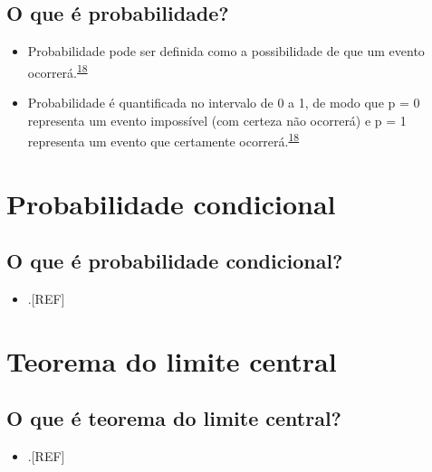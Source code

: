 \documentclass[
]{book}
\providecommand{\tightlist}{%
  \setlength{\itemsep}{0pt}\setlength{\parskip}{0pt}}
\begin{document}
\hypertarget{o-que-uxe9-probabilidade}{%
\subsection{O que é probabilidade?}\label{o-que-uxe9-probabilidade}}

\begin{itemize}
\item
  Probabilidade pode ser definida como a possibilidade de que um evento ocorrerá.\textsuperscript{\protect\hyperlink{ref-Ali2016}{18}}
\item
  Probabilidade é quantificada no intervalo de 0 a 1, de modo que p = 0 representa um evento impossível (com certeza não ocorrerá) e p = 1 representa um evento que certamente ocorrerá.\textsuperscript{\protect\hyperlink{ref-Ali2016}{18}}
\end{itemize}

\hypertarget{probabilidade-ciondicional}{%
\section{Probabilidade condicional}\label{probabilidade-ciondicional}}

\hypertarget{o-que-uxe9-probabilidade-condicional}{%
\subsection{O que é probabilidade condicional?}\label{o-que-uxe9-probabilidade-condicional}}

\begin{itemize}
\tightlist
\item
  .{[}REF{]}
\end{itemize}

\hypertarget{teorema-limite-central}{%
\section{Teorema do limite central}\label{teorema-limite-central}}

\hypertarget{o-que-uxe9-teorema-do-limite-central}{%
\subsection{O que é teorema do limite central?}\label{o-que-uxe9-teorema-do-limite-central}}

\begin{itemize}
\tightlist
\item
  .{[}REF{]}
\end{itemize}
\end{document}
